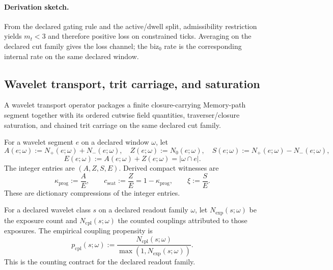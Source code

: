 \paragraph{Derivation sketch.} From the declared gating rule and the active/dwell split, admissibility restriction yields $m_t<3$ and therefore positive loss on constrained ticks. Averaging on the declared cut family gives the loss channel; the \(\mathrm{biz}_0\) rate is the corresponding internal rate on the same declared window.

\subsection{Wavelet transport, trit carriage, and saturation}\label{subsec:wavelet-transport-saturation}
\begin{definition}
\label{def:wavelet-transport-operator}
A wavelet transport operator packages a finite closure-carrying Memory-path segment together with its ordered cutwise field quantities, traverser/closure saturation, and chained trit carriage on the same declared cut family.
\end{definition}

\begin{definition}
\label{def:wavelet-mode-witness}
For a wavelet segment $e$ on a declared window $\omega$, let
\[
A(e;\omega):=N_+(e;\omega)+N_-(e;\omega),\quad Z(e;\omega):=N_0(e;\omega),\quad S(e;\omega):=N_+(e;\omega)-N_-(e;\omega),
\]
\[
E(e;\omega):=A(e;\omega)+Z(e;\omega)=|\omega\cap e|.
\]
The integer entries are $(A,Z,S,E)$. Derived compact witnesses are
\[
\kappa_{\mathrm{prog}}:=\frac{A}{E},\qquad c_{\mathrm{seat}}:=\frac{Z}{E}=1-\kappa_{\mathrm{prog}},\qquad \xi:=\frac{S}{E}.
\]
These are dictionary compressions of the integer entries.
\end{definition}

\begin{definition}
\label{def:coupling-exposure}
For a declared wavelet class $s$ on a declared readout family $\omega$, let $N_{\mathrm{exp}}(s;\omega)$ be the exposure count and $N_{\mathrm{cpl}}(s;\omega)$ the counted couplings attributed to those exposures. The empirical coupling propensity is
\[
p_{\mathrm{cpl}}(s;\omega):=\frac{N_{\mathrm{cpl}}(s;\omega)}{\max(1,N_{\mathrm{exp}}(s;\omega))}.
\]
This is the counting contract for the declared readout family.
\end{definition}

